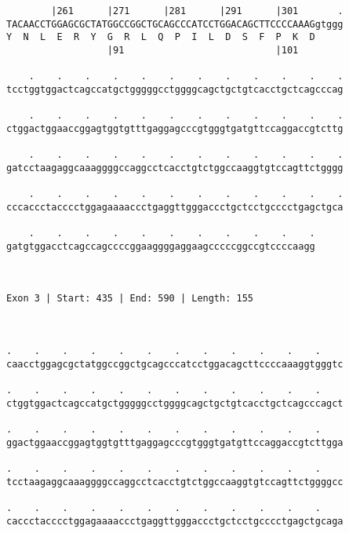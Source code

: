 \documentclass{article}
\begin{document}
\begin{Verbatim}
        |261      |271      |281      |291      |301       .
TACAACCTGGAGCGCTATGGCCGGCTGCAGCCCATCCTGGACAGCTTCCCCAAAGgtggg
Y  N  L  E  R  Y  G  R  L  Q  P  I  L  D  S  F  P  K  D     
                  |91                           |101        
  
    .    .    .    .    .    .    .    .    .    .    .    .
tcctggtggactcagccatgctgggggcctggggcagctgctgtcacctgctcagcccag
                                                            
    .    .    .    .    .    .    .    .    .    .    .    .
ctggactggaaccggagtggtgtttgaggagcccgtgggtgatgttccaggaccgtcttg
                                                            
    .    .    .    .    .    .    .    .    .    .    .    .
gatcctaagaggcaaaggggccaggcctcacctgtctggccaaggtgtccagttctgggg
                                                            
    .    .    .    .    .    .    .    .    .    .    .    .
cccaccctacccctggagaaaaccctgaggttgggaccctgctcctgcccctgagctgca
                                                            
    .    .    .    .    .    .    .    .    .    .    .
gatgtggacctcagccagccccggaaggggaggaagcccccggccgtccccaagg
                                                       
                                                       
 
Exon 3 | Start: 435 | End: 590 | Length: 155



.    .    .    .    .    .    .    .    .    .    .    .    
caacctggagcgctatggccggctgcagcccatcctggacagcttccccaaaggtgggtc
                                                            
.    .    .    .    .    .    .    .    .    .    .    .    
ctggtggactcagccatgctgggggcctggggcagctgctgtcacctgctcagcccagct
                                                            
.    .    .    .    .    .    .    .    .    .    .    .    
ggactggaaccggagtggtgtttgaggagcccgtgggtgatgttccaggaccgtcttgga
                                                            
.    .    .    .    .    .    .    .    .    .    .    .    
tcctaagaggcaaaggggccaggcctcacctgtctggccaaggtgtccagttctggggcc
                                                            
.    .    .    .    .    .    .    .    .    .    .    .    
caccctacccctggagaaaaccctgaggttgggaccctgctcctgcccctgagctgcaga
                                                            

\end{Verbatim}
\end{document}
